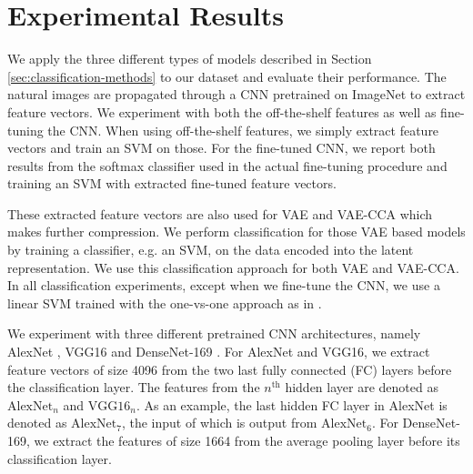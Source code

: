\section{Experimental Results}\label{sec:experimental-results}

We apply the three different types of models described in Section \ref{sec:classification-methods} to our dataset and evaluate their performance. The natural images are propagated through a CNN pretrained on ImageNet to extract feature vectors. We experiment with both the off-the-shelf features as well as fine-tuning the CNN. When using off-the-shelf features, we simply extract feature vectors and train an SVM on those. For the fine-tuned CNN, we report both results from the softmax classifier used in the actual fine-tuning procedure and training an SVM with extracted fine-tuned feature vectors.  

These extracted feature vectors are also used for VAE and VAE-CCA which makes further compression. We perform classification for those VAE based models by training a classifier, e.g. an SVM, on the data encoded into the latent representation. We use this classification approach for both VAE and VAE-CCA. In all classification experiments, except when we fine-tune the CNN, we use a linear SVM trained with the one-vs-one approach as in \cite{razavian2014cnnfeatures}.

We experiment with three different pretrained CNN architectures, namely AlexNet \cite{krizhevsky2012imagenet}, VGG16 \cite{simonyan2014verydeep} and DenseNet-169 \cite{huang2017densely}. For AlexNet and VGG16, we extract feature vectors of size 4096 from the two last fully connected (FC) layers before the classification layer. The features from the $n^{\text{th}}$ hidden layer are denoted as $\text{AlexNet}_{n}$ and $\text{VGG16}_{n}$. As an example, the last hidden FC layer in AlexNet is denoted as $\text{AlexNet}_{7}$, the input of which is output from $\text{AlexNet}_{6}$. For DenseNet-169, we extract the features of size 1664 from the average pooling layer before its classification layer.

